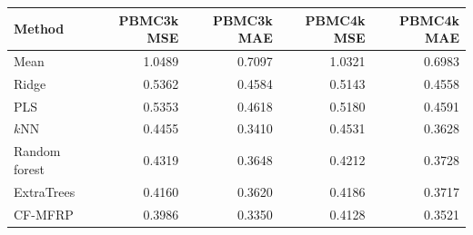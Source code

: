\begin{tabular}{lrrrr}
\toprule
Method & PBMC3k MSE & PBMC3k MAE & PBMC4k MSE & PBMC4k MAE\\
\midrule
Mean & 1.0489 & 0.7097 & 1.0321 & 0.6983\\
Ridge & 0.5362 & 0.4584 & 0.5143 & 0.4558\\
PLS & 0.5353 & 0.4618 & 0.5180 & 0.4591\\
$k$NN & 0.4455 & 0.3410 & 0.4531 & 0.3628\\
Random forest & 0.4319 & 0.3648 & 0.4212 & 0.3728\\
ExtraTrees & 0.4160 & 0.3620 & 0.4186 & 0.3717\\
CF-MFRP & 0.3986 & 0.3350 & 0.4128 & 0.3521\\
\bottomrule
\end{tabular}
